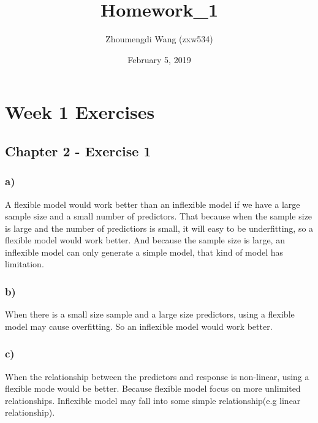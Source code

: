 \documentclass[]{article}
\title{Homework\_1}
\author{Zhoumengdi Wang (zxw534)}
\date{February 5, 2019}
\newenvironment{Shaded}{\begin{snugshade}}{\end{snugshade}}
\newcommand{\KeywordTok}[1]{\textcolor[rgb]{0.13,0.29,0.53}{\textbf{#1}}}
\newcommand{\DataTypeTok}[1]{\textcolor[rgb]{0.13,0.29,0.53}{#1}}
\newcommand{\OtherTok}[1]{\textcolor[rgb]{0.56,0.35,0.01}{#1}}
\newcommand{\OperatorTok}[1]{\textcolor[rgb]{0.81,0.36,0.00}{\textbf{#1}}}
\newcommand{\NormalTok}[1]{#1}
\begin{document}
\maketitle

\begin{Shaded}
\end{Shaded}

\section{Week 1 Exercises}\label{week-1-exercises}

\subsection{Chapter 2 - Exercise 1}\label{chapter-2---exercise-1}

\subsubsection{a)}\label{a}

A flexible model would work better than an inflexible model if we have a
large sample size and a small number of predictors. That because when
the sample size is large and the number of predictiors is small, it will
easy to be underfitting, so a flexible model would work better. And
because the sample size is large, an inflexible model can only generate
a simple model, that kind of model has limitation.

\subsubsection{b)}\label{b}

When there is a small size sample and a large size predictors, using a
flexible model may cause overfitting. So an inflexible model would work
better.

\subsubsection{c)}\label{c}

When the relationship between the predictors and response is non-linear,
using a flexible mode would be better. Because flexible model focus on
more unlimited relationships. Inflexible model may fall into some simple
relationship(e.g linear relationship).
\end{document}
